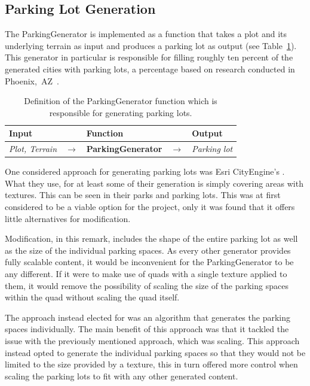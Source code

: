 \subsection{Parking Lot Generation}
The ParkingGenerator is implemented as a function that takes a plot and its underlying terrain as input and produces a parking lot as output (see Table~\ref{table:parking}).
This generator in particular is responsible for filling roughly ten percent of the generated cities with parking lots, a percentage based on research conducted in Phoenix,~AZ~\cite{parking_percent}.
\begin{table}[H]
   \centering
   \begin{tabular}{lllll}
     \textbf{Input}                           &               & \textbf{Function}            &               & \textbf{Output}         \\
     \midrule
     \textit{Plot, Terrain}                   & $\rightarrow$ & \textbf{ParkingGenerator}       & $\rightarrow$ & \textit{Parking lot}           \\
     \bottomrule
   \end{tabular}

   \caption{Definition of the ParkingGenerator function which is responsible for generating parking lots.}
   \label{table:parking}
 \end{table}
 \vspace{-0.4cm}

One considered approach for generating parking lots was Esri CityEngine's \cite{Esri}.  %
What they use, for at least some of their generation is simply covering areas with textures. This can be seen in their parks and parking lots. 
This was at first considered to be a viable option for the project, only it was found that it offers little alternatives for modification. 

Modification, in this remark, includes the shape of the entire parking lot as well as the size of the individual parking spaces.
As every other generator provides fully scalable content, it would be inconvenient for the ParkingGenerator to be any different.
If it were to make use of quads with a single texture applied to them, it would remove the possibility of scaling the size of the parking spaces within the quad without scaling the quad itself.

The approach instead elected for was an algorithm that generates the parking spaces individually.
The main benefit of this approach was that it tackled the issue with the previously mentioned approach, which was scaling.
This approach instead opted to generate the individual parking spaces so that they would not be limited to the size provided by a texture, this in turn offered more control when scaling the parking lots to fit with any other generated content.

